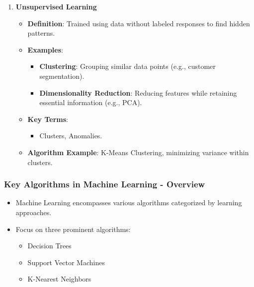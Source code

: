 \documentclass{beamer}
\begin{document}
\begin{frame}[fragile]
\begin{enumerate}
        \item \textbf{Unsupervised Learning}
            \begin{itemize}
                \item \textbf{Definition}: Trained using data without labeled responses to find hidden patterns.
                \item \textbf{Examples}:
                \begin{itemize}
                    \item \textbf{Clustering}: Grouping similar data points (e.g., customer segmentation).
                    \item \textbf{Dimensionality Reduction}: Reducing features while retaining essential information (e.g., PCA).
                \end{itemize}
                \item \textbf{Key Terms}:
                \begin{itemize}
                    \item Clusters, Anomalies.
                \end{itemize}
                \item \textbf{Algorithm Example}: K-Means Clustering, minimizing variance within clusters.
            \end{itemize}
    \end{enumerate}
\end{frame}

\begin{frame}[fragile]
    \frametitle{Key Algorithms in Machine Learning - Overview}
    \begin{itemize}
        \item Machine Learning encompasses various algorithms categorized by learning approaches.
        \item Focus on three prominent algorithms:
        \begin{itemize}
            \item Decision Trees
            \item Support Vector Machines
            \item K-Nearest Neighbors
        \end{itemize}
    \end{itemize}
\end{frame}
\end{document}

